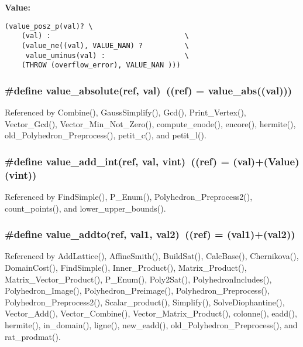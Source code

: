 {\bf Value:}

\footnotesize\begin{verbatim}(value_posz_p(val)? \
    (val) :                                \
    (value_ne((val), VALUE_NAN) ?          \
     value_uminus(val) :                   \
    (THROW (overflow_error), VALUE_NAN )))\end{verbatim}\normalsize 
{}
\subsubsection{\setlength{\rightskip}{0pt plus 5cm}\#define value\_\-absolute(ref, val)\ ((ref) = value\_\-abs((val)))}\label{arithmetique_8h_a55}




Referenced by Combine(), Gauss\-Simplify(), Gcd(), Print\_\-Vertex(), Vector\_\-Gcd(), Vector\_\-Min\_\-Not\_\-Zero(), compute\_\-enode(), encore(), hermite(), old\_\-Polyhedron\_\-Preprocess(), petit\_\-c(), and petit\_\-l().

\subsubsection{\setlength{\rightskip}{0pt plus 5cm}\#define value\_\-add\_\-int(ref, val, vint)\ ((ref) = (val)+(Value)(vint))}\label{arithmetique_8h_a44}




Referenced by Find\-Simple(), P\_\-Enum(), Polyhedron\_\-Preprocess2(), count\_\-points(), and lower\_\-upper\_\-bounds().

\subsubsection{\setlength{\rightskip}{0pt plus 5cm}\#define value\_\-addto(ref, val1, val2)\ ((ref) = (val1)+(val2))}\label{arithmetique_8h_a43}




Referenced by Add\-Lattice(), Affine\-Smith(), Build\-Sat(), Calc\-Base(), Chernikova(), Domain\-Cost(), Find\-Simple(), Inner\_\-Product(), Matrix\_\-Product(), Matrix\_\-Vector\_\-Product(), P\_\-Enum(), Poly2Sat(), Polyhedron\-Includes(), Polyhedron\_\-Image(), Polyhedron\_\-Preimage(), Polyhedron\_\-Preprocess(), Polyhedron\_\-Preprocess2(), Scalar\_\-product(), Simplify(), Solve\-Diophantine(), Vector\_\-Add(), Vector\_\-Combine(), Vector\_\-Matrix\_\-Product(), colonne(), eadd(), hermite(), in\_\-domain(), ligne(), new\_\-eadd(), old\_\-Polyhedron\_\-Preprocess(), and rat\_\-prodmat().

